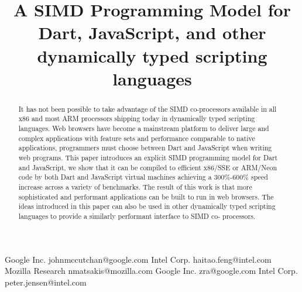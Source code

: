 \documentclass[preprint]{sigplanconf}
\begin{document}
\setlength{\pdfpageheight}{\paperheight}
\setlength{\pdfpagewidth}{\paperwidth}






\title{A SIMD Programming Model for Dart, JavaScript, and other dynamically typed scripting languages}

           {Google Inc.}
           {johnmccutchan@google.com}
           {Intel Corp.}
           {haitao.feng@intel.com}
           {Mozilla Research}
           {nmatsakis@mozilla.com}
           {Google Inc.}
           {zra@google.com}
           {Intel Corp.}
           {peter.jensen@intel.com}

\maketitle

\begin{abstract}

It has not been possible to take advantage of the SIMD co-processors available
in all x86 and most ARM processors shipping today in dynamically typed scripting
languages. Web browsers have become a mainstream platform to deliver large and
complex applications with feature sets and performance comparable to native
applications, programmers must choose between Dart and JavaScript when writing
web programs. This paper introduces an explicit SIMD programming model for Dart
and JavaScript, we show that it can be compiled to efficient x86/SSE or ARM/Neon
code by both Dart and JavaScript virtual machines achieving a 300\%-600\% speed
increase across a variety of benchmarks. The result of this work is that more
sophisticated and performant applications can be built to run in web browsers.
The ideas introduced in this paper can also be used in other dynamically typed
scripting languages to provide a similarly performant interface to SIMD co-
processors.

\end{abstract}
\end{document}

